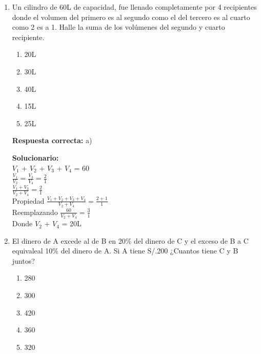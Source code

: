 \begin{enumerate}
	
	\vspace{6mm}
	
	\item Un cilindro de 60L de capacidad, fue llenado completamente por 4 recipientes donde el volumen del primero es al segundo como el del tercero es al cuarto como 2 es a 1. Halle la suma de los volúmenes del segundo y cuarto recipiente.
	\begin{enumerate}[label=\alph*)]
		\item 20L
		\item 30L
		\item 40L
		\item 15L
		\item 25L
	\end{enumerate}
	
	\textbf{Respuesta correcta:} a)
	
	\vspace{2mm}
	\textbf{Solucionario:}\\
	$V_1$ + $V_2$ + $V_3$ + $V_4$ = 60\\
	
	$\displaystyle\frac{V_1}{V_2} = \frac{V_3}{V_4} = \frac{2}{1}$\\
	
	$\displaystyle\frac{V_1+V_3}{V_2+V_4} = \frac{2}{1}$\\
	
	Propiedad   $\displaystyle\frac{V_1+V_2+V_3+V_4}{V_2+V_4} = \frac{2+1}{1}$\\
	
	Reemplazando   $\displaystyle\frac{60}{V_2+V_4} = \frac{3}{1}$\\
	
	Donde $V_2$ + $V_4$ = 20L
	
	\vspace{6mm}
	
	\item El dinero de A excede al de B en 20\% del dinero de C y el exceso de B a C equivaleal 10\% del dinero de A. Si A tiene S/.200 ¿Cuantos tiene C y B juntos? 
	
	
	
	
	\begin{enumerate}[label=\alph*)]
		\item 280
		\item 300
		\item 420
		\item 360
		\item 320
	\end{enumerate}
	

\end{enumerate}
